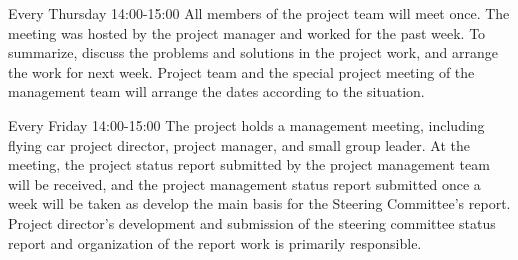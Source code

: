 Every Thursday 14:00-15:00 All members of the project team will meet once. The meeting was hosted by the project manager and worked for the past week. To summarize, discuss the problems and solutions in the project work, and arrange the work for next week. Project team and the special project meeting of the management team will arrange the dates according to the situation.

Every Friday 14:00-15:00 The project holds a management meeting, including flying car project director, project manager, and small group leader. At the meeting, the project status report submitted by the project management team will be received, and the project management status report submitted once a week will be taken as develop the main basis for the Steering Committee's report. Project director's development and submission of the steering committee status report and organization of the report work is primarily responsible.



